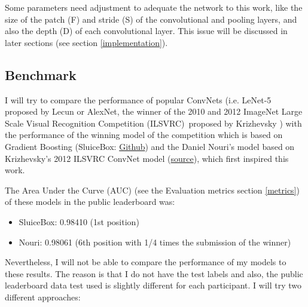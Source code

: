 \documentclass[]{article}
\newcommand{\imagenet}{ImageNet Large Scale Visual Recognition Competition (ILSVRC)}
\begin{document}
Some parameters need adjustment to adequate the network to this work, like the size of the patch (F) and stride (S) of the convolutional and pooling layers, and also the depth (D) of each convolutional layer. This issue will be discussed in later sections (see section \ref{implementation}).

\subsection{Benchmark}\label{benchmark}

I will try to compare the performance of popular ConvNets (i.e. LeNet-5 proposed by Lecun \cite{Lecun98} or AlexNet, the winner of the 2010 and 2012 \imagenet \, proposed by Krizhevsky \cite{Krizhevsky12, Krizhevsky2010}) with the performance of the winning model of the competition which is based on Gradient Boosting (SluiceBox: \href{https://github.com/nmkridler/moby}{Github}) and the Daniel Nouri's model based on Krizhevsky's 2012 ILSVRC ConvNet model \cite{Krizhevsky12} (\href{https://speakerdeck.com/dnouri/practical-deep-neural-nets-for-detecting-marine-mammals/}{source}), which first inspired this work.

The Area Under the Curve (AUC) (see the Evaluation metrics section \ref{metrics}) of these models in the public leaderboard was:

\begin{itemize}
	\item SluiceBox: 0.98410 (1st position)
	\item Nouri: 0.98061 (6th position with 1/4 times the submission of the winner)
\end{itemize}

Nevertheless, I will not be able to compare the performance of my models to these results. The reason is that I do not have the test labels and also, the public leaderboard data test used is slightly different for each participant. I will try two different approaches:
\end{document}
